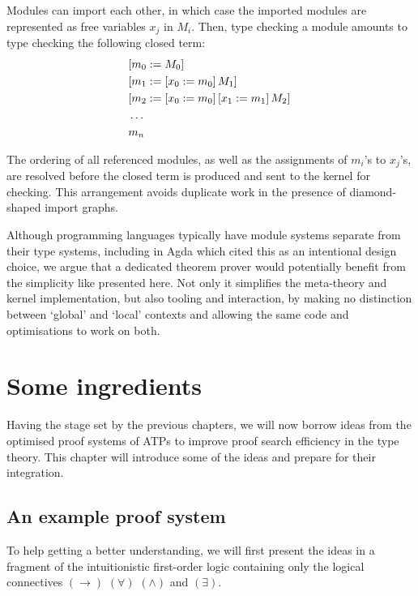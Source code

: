 \documentclass[twoside]{report}
\begin{document}
Modules can import each other, in which case the imported modules are represented as free variables $x_j$ in $M_i$. Then, type checking a module amounts to type checking the following closed term: $$
\begin{aligned}
& [{m_0}:={M_0}]\,{} \\
& [{m_1}:={[{x_0}:={m_0}]\,{M_1}}]\,{} \\
& [{m_2}:={[{x_0}:={m_0}]\,{[{x_1}:={m_1}]\,{M_2}}}]\,{} \\
& \ldots \\
& m_n
\end{aligned}
$$

The ordering of all referenced modules, as well as the assignments of $m_i$'s to $x_j$'s, are resolved before the closed term is produced and sent to the kernel for checking. This arrangement avoids duplicate work in the presence of diamond-shaped import graphs.

Although programming languages typically have module systems separate from their type systems, including in Agda \cite{norell2007towards} which cited this as an intentional design choice, we argue that a dedicated theorem prover would potentially benefit from the simplicity like presented here. Not only it simplifies the meta-theory and kernel implementation, but also tooling and interaction, by making no distinction between `global' and `local' contexts and allowing the same code and optimisations to work on both.

\chapter{Some ingredients}
\label{sec:ingredients}

Having the stage set by the previous chapters, we will now borrow ideas from the optimised proof systems of ATPs to improve proof search efficiency in the type theory. This chapter will introduce some of the ideas and prepare for their integration.

\section{An example proof system}
\label{sec:example_proof_system}

To help getting a better understanding, we will first present the ideas in a fragment of the intuitionistic first-order logic \cite{gentzen1964investigations} containing only the logical connectives $(\to)$ $(\forall)$ $(\land)$ and $(\exists)$.
\end{document}
